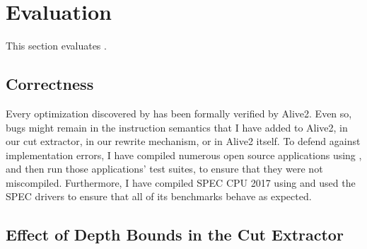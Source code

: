 \section{Evaluation}
\label{sec:evaluation}

This section evaluates \minotaur{}.


\subsection{Correctness}

Every optimization discovered by \minotaur{} has been formally verified by
Alive2.
%
Even so, bugs might remain in the instruction semantics that I have
added to Alive2, in our cut extractor, in our rewrite mechanism, or in
Alive2 itself.
%
To defend against implementation errors, I have compiled numerous
open source applications using \minotaur, and then run those applications'
test suites, to ensure that they were not miscompiled.
%
Furthermore, I have compiled SPEC CPU 2017 using \minotaur{} and
used the SPEC drivers to ensure that all of its benchmarks behave
as expected.


\subsection{Effect of Depth Bounds in the Cut Extractor}
\label{sec:loops}




